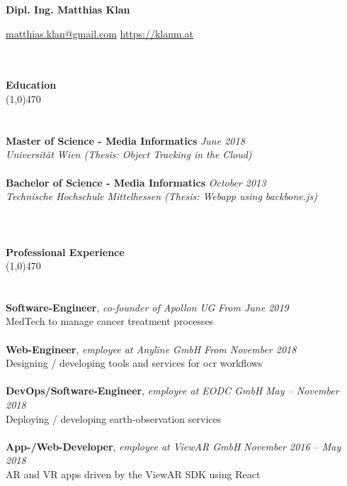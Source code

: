 \documentclass[10pt]{article} %
\begin{document}
\centerline{{\LARGE \bf Dipl. Ing. Matthias Klan}}
\centerline{\href{mailto:matthias.klan@gmail.com}{matthias.klan@gmail.com} \raisebox{0.25ex}{\tiny$\bullet$} \href{https://klanm.at}{https://klanm.at}}

\noindent %
\\\\
{\Large \bf Education}\\
\line(1,0){470}\\
\\\\
\noindent
{\bf Master of Science - Media Informatics} \hfill \textit{June 2018} \\ 
\textit{Universität Wien (Thesis: Object Tracking in the Cloud)}\\\\
\noindent
{\bf Bachelor of Science - Media Informatics} \hfill \textit{October 2013} \\
\textit{Technische Hochschule Mittelhessen (Thesis: Webapp using backbone.js)}\\
\\
\noindent %
\\\\
{\Large \bf Professional Experience}\\
\line(1,0){470}\\
\\\\
\noindent
{\bf Software-Engineer}, \textit{co-founder of Apollon UG}  \hfill \textit{ From June 2019 } \\ 
MedTech to manage cancer treatment processes  \\\\
\noindent
\noindent
{\bf Web-Engineer}, \textit{employee at Anyline GmbH}  \hfill \textit{ From November 2018 } \\ 
Designing / developing tools and services for ocr workflows   \\\\
\noindent
\noindent
{\bf DevOps/Software-Engineer}, \textit{employee at EODC GmbH}  \hfill \textit{ May -- November 2018 } \\ 
Deploying / developing earth-observation services\\\\
\noindent
\noindent
{\bf App-/Web-Developer}, \textit{employee at ViewAR GmbH}  \hfill \textit{ November 2016 -- May 2018 } \\ 
AR and VR apps driven by the ViewAR SDK using React\\\\
\end{document}
